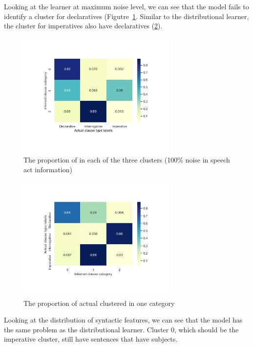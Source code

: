 Looking at the learner at maximum noise level, we can see that the model fails to identify a cluster for declaratives (Figutre~\ref{fig:noisy100-heatmap}. Similar to the distributional learner, the cluster for imperatives also have declaratives (\ref{fig:noisy100-heatrev}). 



\begin{figure}[H]
    \centering
    \includegraphics[width=0.7\textwidth]{figures/noisy100-heatmap.jpg}
    \caption{The proportion of \diis{} in each of the three clusters (100\% noise in speech act information) }
    \label{fig:noisy100-heatmap}
\end{figure}

\begin{figure}[H]
    \centering
    \includegraphics[width=0.7\textwidth]{figures/noisy100-heatrev.jpg}
    \caption{The proportion of actual \diis{} clustered in one category}
    \label{fig:noisy100-heatrev}
\end{figure}

Looking at the distribution of syntactic features, we can see that the model has the same problem as the distributional learner. Cluster $0$, which should be the imperative cluster, still have sentences that have subjects. 

